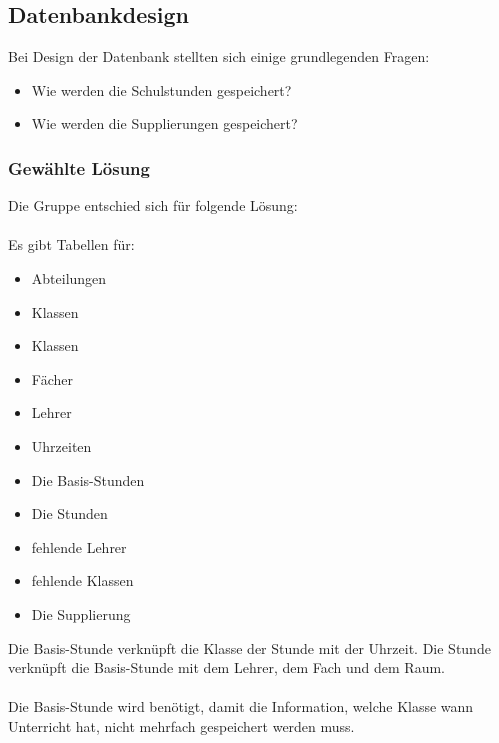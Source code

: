 \subsection{Datenbankdesign}
Bei Design der Datenbank stellten sich einige grundlegenden Fragen:

\begin{itemize}
	\item Wie werden die Schulstunden gespeichert?
	\item Wie werden die Supplierungen gespeichert?
\end{itemize}

\subsubsection{Gewählte Lösung}
Die Gruppe entschied sich für folgende Lösung:\\
\\
Es gibt Tabellen für:\\
\begin{itemize}
	\item Abteilungen
	\item Klassen
	\item Klassen
	\item Fächer
	\item Lehrer
	\item Uhrzeiten
\end{itemize}
\vspace{0.03cm}
\begin{itemize}
	\item Die Basis-Stunden
	\item Die Stunden
\end{itemize}
\vspace{0.03cm}
\begin{itemize}
	\item fehlende Lehrer
	\item fehlende Klassen
\end{itemize}
\vspace{0.03cm}
\begin{itemize}
	\item Die Supplierung
\end{itemize}
Die Basis-Stunde verknüpft die Klasse der Stunde mit der Uhrzeit. Die Stunde verknüpft die Basis-Stunde mit dem Lehrer, dem Fach und dem Raum.\\
\\
Die Basis-Stunde wird benötigt, damit die Information, welche Klasse wann Unterricht hat, nicht mehrfach gespeichert werden muss.\\
